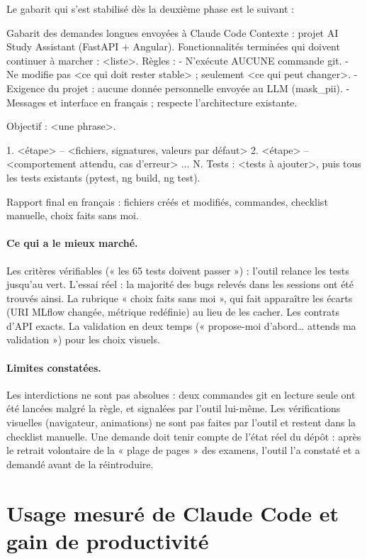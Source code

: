 \documentclass[12pt,a4paper]{report}
\begin{document}
Le gabarit qui s'est stabilisé dès la deuxième phase est le suivant :

\begin{prompt}{Gabarit des demandes longues envoyées à Claude Code}
Contexte : projet AI Study Assistant (FastAPI + Angular). Fonctionnalités terminées qui doivent
continuer à marcher : <liste>.
Règles :
- N'exécute AUCUNE commande git.
- Ne modifie pas <ce qui doit rester stable> ; seulement <ce qui peut changer>.
- Exigence du projet : aucune donnée personnelle envoyée au LLM (mask_pii).
- Messages et interface en français ; respecte l'architecture existante.

Objectif : <une phrase>.

1. <étape> -- <fichiers, signatures, valeurs par défaut>
2. <étape> -- <comportement attendu, cas d'erreur>
...
N. Tests : <tests à ajouter>, puis tous les tests existants (pytest, ng build, ng test).

Rapport final en français : fichiers créés et modifiés, commandes, checklist manuelle, choix
faits sans moi.
\end{prompt}

\paragraph{Ce qui a le mieux marché.} Les critères vérifiables (« les 65 tests doivent passer ») : l'outil
relance les tests jusqu'au vert. L'essai réel : la majorité des bugs relevés dans les sessions ont été
trouvés ainsi. La rubrique « choix faits sans moi », qui fait apparaître les écarts (URI MLflow changée,
métrique redéfinie) au lieu de les cacher. Les contrats d'API exacts. La validation en deux temps
(« propose-moi d'abord… attends ma validation ») pour les choix visuels.

\paragraph{Limites constatées.} Les interdictions ne sont pas absolues : deux commandes git en lecture
seule ont été lancées malgré la règle, et signalées par l'outil lui-même. Les vérifications visuelles
(navigateur, animations) ne sont pas faites par l'outil et restent dans la checklist manuelle. Une demande
doit tenir compte de l'état réel du dépôt : après le retrait volontaire de la « plage de pages » des
examens, l'outil l'a constaté et a demandé avant de la réintroduire.

\section{Usage mesuré de Claude Code et gain de productivité}
\label{sec:productivite}
\end{document}
